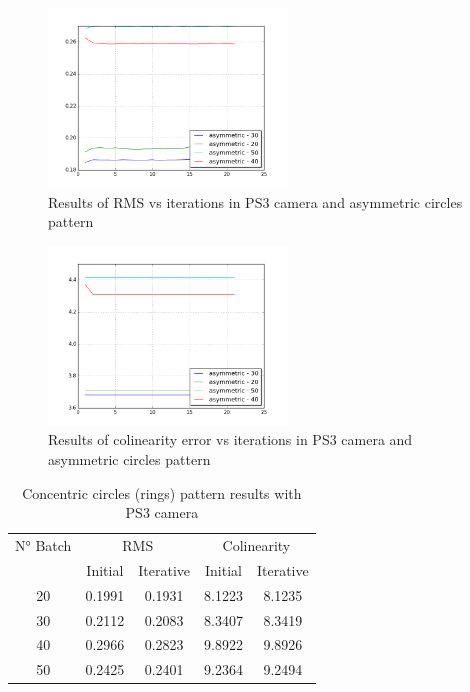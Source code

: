 \documentclass[journal]{IEEEtran}
\begin{document}
\begin{figure}[H]
\centering
\includegraphics[width=2.5in]{_img/report_4/img_results_ps3_asymmetric.png}
\caption{Results of RMS vs iterations in PS3 camera and asymmetric circles pattern}
\end{figure}

\begin{figure}[H]
\centering
\includegraphics[width=2.5in]{_img/report_4/img_results_ps3_colinearity_asymmetric.png}
\caption{Results of colinearity error vs iterations in PS3 camera and asymmetric circles pattern}
\end{figure}

\begin{table}[h]
\centering
\caption{Concentric circles (rings) pattern results with PS3 camera}
\begin{tabular}{ |c||c|c|c|c|  }
 \hline
 N° Batch & \multicolumn{2}{c|}{RMS} & \multicolumn{2}{c|}{Colinearity}\\
 \cline{2-5}
 & Initial & Iterative & Initial & Iterative \\
 \hline
 20        & 0.1991 & 0.1931 & 8.1223 & 8.1235 \\
 30        & 0.2112 & 0.2083 & 8.3407 & 8.3419 \\
 40        & 0.2966 & 0.2823 & 9.8922 & 9.8926 \\
 50        & 0.2425 & 0.2401 & 9.2364 & 9.2494 \\
 \hline
\end{tabular}
\\
\end{table}
\end{document}
